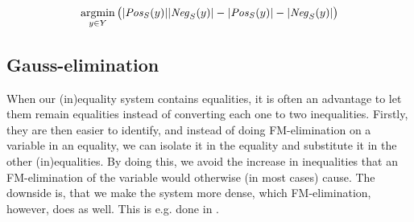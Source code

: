 \[
\argmin_{y\in Y}\big(|\Pos_S(y)||\Neg_S(y)| - |\Pos_S(y)|-|\Neg_S(y)|\big)
\] 
%
%
\subsection{Gauss-elimination}
When our (in)equality system contains equalities, it is often an advantage to let them remain equalities instead of converting each one to two inequalities. Firstly, they are then easier to identify, and instead of doing FM-elimination on a variable in an equality, we can isolate it in the equality and substitute it in the other (in)equalities. By doing this, we avoid the increase in inequalities that an FM-elimination of the variable would otherwise (in most cases) cause. The downside is, that we make the system more dense, which FM-elimination, however, does as well. This is e.g. done in \cite{simon05}.

